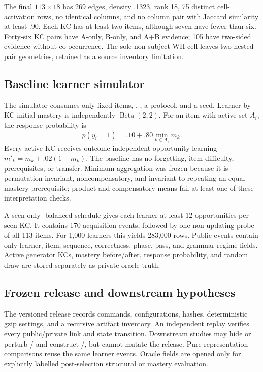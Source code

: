 The final $113{\times}18$ \qstar{} has 269 edges, density .1323, rank 18, 75
distinct cell-activation rows, no identical columns, and no column pair with
Jaccard similarity at least .90.  Each KC has at least two items, although
seven have fewer than six.  Forty-six KC pairs have A-only, B-only, and A+B
evidence; 105 have two-sided evidence without co-occurrence.  The sole
non-subject-WH cell leaves two nested pair geometries, retained as a source
inventory limitation.

\subsection{Baseline learner simulator}

The simulator consumes only fixed items, \kstar{}, \qstar{}, a protocol, and a
seed.  Learner-by-KC initial mastery is independently
$\operatorname{Beta}(2,2)$.  For an item with active set $A_i$, the response
probability is
\begin{equation}
 p(y_i=1)=.10+.80\min_{k\in A_i}m_k .
\end{equation}
Every active KC receives outcome-independent opportunity learning
$m'_k=m_k+.02(1-m_k)$.  The baseline has no forgetting, item difficulty,
prerequisites, or transfer.  Minimum aggregation was frozen because it is
permutation invariant, noncompensatory, and invariant to repeating an
equal-mastery prerequisite; product and compensatory means fail at least one
of these interpretation checks.

A seen-only \qstar-balanced schedule gives each learner at least 12
opportunities per seen KC.  It contains 170 acquisition events, followed by
one non-updating probe of all 113 items.  For 1,000 learners this yields 283,000
rows.  Public events contain only learner, item, sequence, correctness, phase,
pass, and grammar-regime fields.  Active generator KCs, mastery before/after,
response probability, and random draw are stored separately as private oracle
truth.

\subsection{Frozen release and downstream hypotheses}

The versioned release records commands, configurations, hashes, deterministic
gzip settings, and a recursive artifact inventory.  An independent replay
verifies every public/private link and state transition.  Downstream studies
may hide or perturb \kstar/\qstar{} and construct \khat/\qhat{}, but cannot
mutate the release.  Pure representation comparisons reuse the same learner
events.  Oracle fields are opened only for explicitly labelled post-selection
structural or mastery evaluation.


